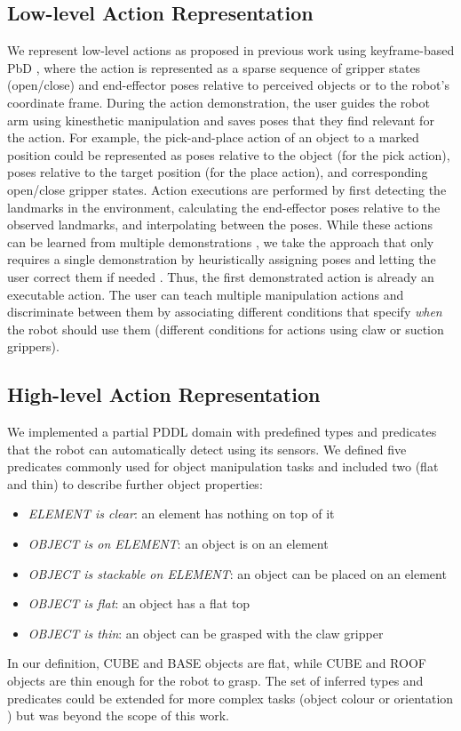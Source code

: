 \subsection{Low-level Action Representation}
\label{sec:lowlevel}
We represent low-level actions as proposed in previous work using keyframe-based PbD \cite{alexandrova2014robot}, where the action is represented as a sparse sequence of gripper states (open/close) and end-effector poses relative to perceived objects or to the robot's coordinate frame.
During the action demonstration, the user guides the robot arm using kinesthetic manipulation and saves poses that they find relevant for the action.
For example, the pick-and-place action of an object to a marked position could be represented as poses relative to the object (for the pick action), poses relative to the target position (for the place action), and corresponding open/close gripper states. 
Action executions are performed by first detecting the landmarks in the environment, calculating the end-effector poses relative to the observed landmarks, and interpolating between the poses.
While these actions can be learned from multiple demonstrations \cite{niekum2012learning}, we take the approach that only requires a single demonstration by heuristically assigning poses and letting the user correct them if needed \cite{alexandrova2014robot}.
Thus, the first demonstrated action is already an executable action.
The user can teach multiple manipulation actions and discriminate between them by associating different conditions that specify \textit{when} the robot should use them (\eg different conditions for actions using claw or suction grippers).

\subsection{High-level Action Representation}
\label{sec:highlevel}
We implemented a partial PDDL domain with predefined types and predicates that the robot can automatically detect using its sensors.
We defined five predicates commonly used for object manipulation tasks and included two (flat and thin) to describe further object properties:
\begin{itemize}
	\item \textit{ELEMENT is clear}: an element has nothing on top of it
	\item \textit{OBJECT is on ELEMENT}: an object is on an element
	\item \textit{OBJECT is stackable on ELEMENT}: an object can be placed on an element
	\item \textit{OBJECT is flat}: an object has a flat top
	\item \textit{OBJECT is thin}: an object can be grasped with the claw gripper
\end{itemize}
In our definition, CUBE and BASE objects are flat, while CUBE and ROOF objects are thin enough for the robot to grasp.
The set of inferred types and predicates could be extended for more complex tasks (\eg object colour or orientation \cite{li2016learning}) but was beyond the scope of this work.


